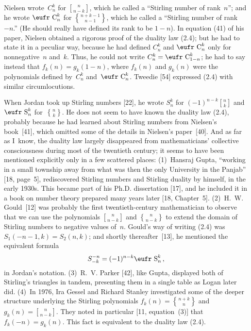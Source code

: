 Nielsen wrote~$C_n^k$ for ${n\brack n-k}$, which he called a
``Stirling number of rank~$n$''; and he wrote $\hbox{\eufr C}_n^k$
for ${n+k-1\brace n-1}$, which he called a ``Stirling number of
rank~$-n$.'' (He should really have defined its rank to be $1-n$).
In equation (41) of his paper, Nielsen obtained a rigorous proof
of the duality law (2.4); but he had to state it in a peculiar way,
because he had defined $C_n^k$ and $\hbox{\eufr C}_n^k$ only for
nonnegative~$n$ and~$k$. Thus, he could not write $C_n^k=\hbox{\eufr
C}_{1-n}^k$; he had to say instead that $f_k(n)=g_k(1-n)$, where
$f_k(n)$ and $g_k(n)$ were the polynomials defined by~$C_n^k$
and~$\hbox{\eufr C}_n^k$. Tweedie [54] expressed (2.4) with similar
circumlocutions. 

When Jordan took up Stirling numbers [22], he wrote $S_n^k$ for
$(-1)^{n-k}{n\brack k}$ and $\hbox{\eufr S}_n^k$ for~${n\brace k}$. He
does not seem to have known the duality law (2.4), probably because he
had learned about Stirling numbers from Nielsen's book~[41], which
omitted some of the details in Nielsen's paper~[40].
And as far as I~know, the duality law largely disappeared from
mathematicians' collective consciousness during most of the twentieth
century; it seems to have been mentioned explicitly
only in a few scattered places: (1)~Hansraj Gupta, ``working in a
small township away from what was then the only University in the
Panjab'' 
[18, page~5], rediscovered Stirling numbers and Stirling duality by
himself, in the early 1930s. This became part of his Ph.D.
dissertation [17], and he included it in a book on number theory prepared
many years later [18, Chapter~5]. (2)~H.~W. Gould~[12] 
was probably the first  twentieth-century mathematician
to observe that we can use the
polynomials ${n\brack n-k}$ and ${n\brace n-k}$ to extend the domain
of Stirling numbers to negative values of~$n$. Gould's way of writing
(2.4) was $S_1(-n-1,k)=S_2(n,k)$; and shortly thereafter~[13], he
mentioned the equivalent formula
$$S_{-k}^{-n}=(-1)^{n-k}\hbox{\eufr S}_n^k\,,$$
in Jordan's notation. 
(3)~R.~V. Parker [42], like Gupta, displayed both of Stirling's
triangles in tandem, presenting them in a single table as Logan later
did. (4)~In 1976, Ira Gessel and Richard Stanley investigated some of
the deeper structure underlying the Stirling polynomials
$f_k(n)={n+k\brace n}$ and $g_k(n)={n\brack n-k}$. They noted in
particular [11, equation~(3)] that $f_k(-n)=g_k(n)$. This fact is
equivalent to the duality law (2.4).

